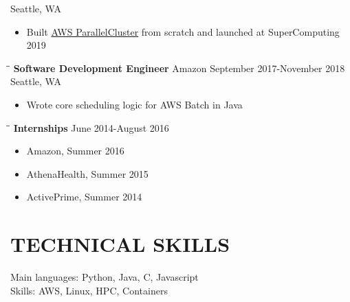 \documentclass{res}
\begin{document}
\begin{resume}
\begin{tabbing}
                             \>Seattle, WA
   \end{tabbing}\vspace{-10pt}      %
   \begin{itemize}
   \setlength\itemsep{0em}
\item Built \href{https://github.com/aws/aws-parallelcluster}{AWS ParallelCluster} from scratch and launched at SuperComputing 2019
    \end{itemize}
\vspace{-0.10in}
 \begin{tabbing}
   \hspace{2.5in}\= \hspace{2.6in}\= \kill %
    {\bf Software Development Engineer} \>Amazon     \>September 2017-November 2018\\
                             \>Seattle, WA
   \end{tabbing}\vspace{-10pt}      %
   \begin{itemize}
   \setlength\itemsep{0em}
\item Wrote core scheduling logic for AWS Batch in Java
    \end{itemize}
\vspace{-0.15in}
 \begin{tabbing}
   \hspace{2.5in}\= \hspace{2.6in}\= \kill %
    {\bf Internships} \>     \>June 2014-August 2016
   \end{tabbing}\vspace{-10pt}      %
   \begin{itemize}
   \setlength\itemsep{0em}
   \item Amazon, Summer 2016
   \item AthenaHealth, Summer 2015
   \item ActivePrime, Summer 2014
    \end{itemize}
\section{TECHNICAL SKILLS}          
    Main languages: Python, Java, C, Javascript \\         
    Skills: AWS, Linux, HPC, Containers
\vspace{-0.10in}

\end{resume}
\end{document}
